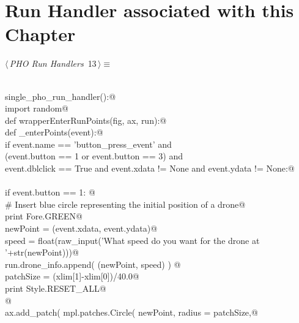 \documentclass[12.0pt]{report}
\begin{document}
\newpage
\section{Run Handler associated with this Chapter}


\begin{flushleft} \small\label{scrap8}\raggedright\small
{} $\langle\,${\itshape PHO Run Handlers}\nobreak\ {\footnotesize {13}}$\,\rangle\equiv$
\vspace{-1ex}
\begin{list}{}{} \item
\mbox{}\verb@@\\
\mbox{}\verb@def single_pho_run_handler():@\\
\mbox{}\verb@    import random@\\
\mbox{}\verb@    def wrapperEnterRunPoints(fig, ax, run):@\\
\mbox{}\verb@      def _enterPoints(event):@\\
\mbox{}\verb@        if event.name      == 'button_press_event'          and \@\\
\mbox{}\verb@           (event.button   == 1 or event.button == 3)       and \@\\
\mbox{}\verb@            event.dblclick == True and event.xdata  != None and event.ydata  != None:@\\
\mbox{}\verb@@\\
\mbox{}\verb@             if event.button == 1:  @\\
\mbox{}\verb@                 # Insert blue circle representing the initial position of a drone@\\
\mbox{}\verb@                 print Fore.GREEN@\\
\mbox{}\verb@                 newPoint = (event.xdata, event.ydata)@\\
\mbox{}\verb@                 speed    = float(raw_input('What speed do you want for the drone at '+str(newPoint)))@\\
\mbox{}\verb@                 run.drone_info.append( (newPoint, speed) ) @\\
\mbox{}\verb@                 patchSize  = (xlim[1]-xlim[0])/40.0@\\
\mbox{}\verb@                 print Style.RESET_ALL@\\
\mbox{}\verb@                 @\\
\mbox{}\verb@                 ax.add_patch( mpl.patches.Circle( newPoint, radius = patchSize,@\\

\end{list}
\end{flushleft}
\end{document}
